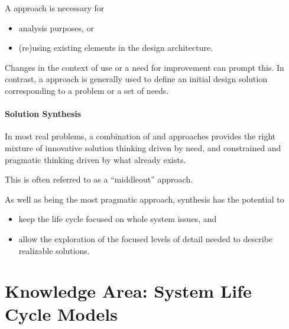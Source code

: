 \documentclass[letterpaper,10pt,english]{jupyterBook}
\begin{document}
\sphinxAtStartPar
A  approach is necessary for
\begin{itemize}
\item {} 
\sphinxAtStartPar
analysis purposes, or

\item {} 
\sphinxAtStartPar
(re)using existing elements in the design architecture.

\end{itemize}

\sphinxAtStartPar
Changes in the context of use or a need for improvement can prompt this.
In contrast, a  approach is generally used to define an initial design solution corresponding to a problem or a set of needs.


\paragraph{Solution Synthesis}
\label{\detokenize{SE/sebok:solution-synthesis}}
\sphinxAtStartPar
In most real problems, a combination of  and  approaches provides the right mixture of innovative solution thinking driven by need, and constrained and pragmatic thinking driven by what already exists.

\sphinxAtStartPar
This is often referred to as a “middle\sphinxhyphen{}out” approach.

\sphinxAtStartPar
As well as being the most pragmatic approach, synthesis has the potential to
\begin{itemize}
\item {} 
\sphinxAtStartPar
keep the life cycle focused on whole system issues, and

\item {} 
\sphinxAtStartPar
allow the exploration of the focused levels of detail needed to describe realizable solutions.

\end{itemize}


\section{Knowledge Area: System Life Cycle Models}
\label{\detokenize{SE/sebok:knowledge-area-system-life-cycle-models}}
\end{document}
